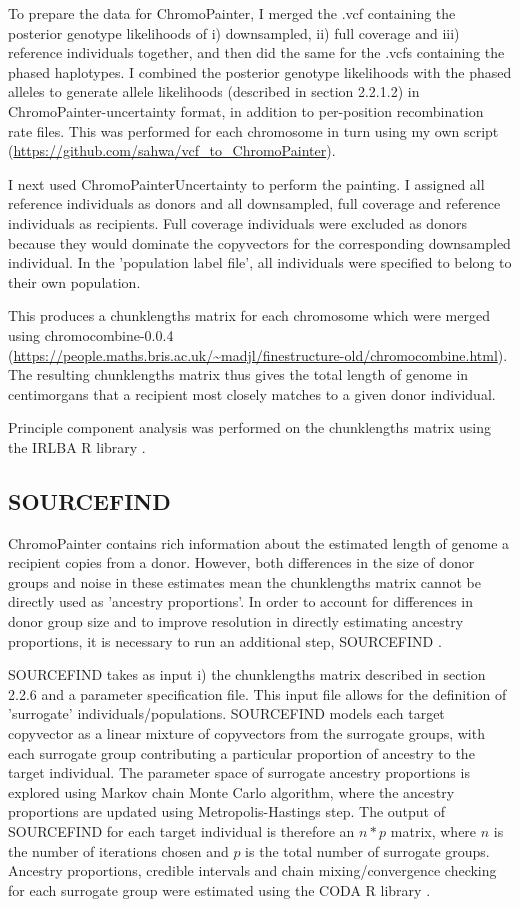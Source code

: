 To prepare the data for ChromoPainter, I merged the .vcf containing the posterior genotype likelihoods of i) downsampled, ii) full coverage and iii) reference individuals together, and then did the same for the .vcfs containing the phased haplotypes.  I combined the posterior genotype likelihoods with the phased alleles to generate allele likelihoods (described in section 2.2.1.2) in ChromoPainter-uncertainty format, in addition to per-position recombination rate files. This was performed for each chromosome in turn using my own script (\url{https://github.com/sahwa/vcf_to_ChromoPainter}).

I next used ChromoPainterUncertainty to perform the painting. I assigned all reference individuals as donors and all downsampled, full coverage and reference individuals as recipients. Full coverage individuals were excluded as donors because they would dominate the copyvectors for the corresponding downsampled individual. In the 'population label file', all individuals were specified to belong to their own population. 

This produces a chunklengths matrix for each chromosome which were merged using chromocombine-0.0.4 (\url{https://people.maths.bris.ac.uk/~madjl/finestructure-old/chromocombine.html}). The resulting chunklengths matrix thus gives the total length of genome in centimorgans that a recipient most closely matches to a given donor individual. 

Principle component analysis was performed on the chunklengths matrix using the IRLBA R library \cite{baglama2005augmented}.

\subsection{SOURCEFIND}

ChromoPainter contains rich information about the estimated length of genome a recipient copies from a donor. However, both differences in the size of donor groups and noise in these estimates mean the chunklengths matrix cannot be directly used as 'ancestry proportions'. In order to account for differences in donor group size and to improve resolution in directly estimating ancestry proportions, it is necessary to run an additional step, SOURCEFIND \cite{Chacon-Duque2018}.

SOURCEFIND takes as input i) the chunklengths matrix described in section 2.2.6 and a parameter specification file. This input file allows for the definition of 'surrogate' individuals/populations. SOURCEFIND models each target copyvector as a linear mixture of copyvectors from the surrogate groups, with each surrogate group contributing a particular proportion of ancestry to the target individual. The parameter space of surrogate ancestry proportions is explored using Markov chain Monte Carlo algorithm, where the ancestry proportions are updated using Metropolis-Hastings step. The output of SOURCEFIND for each target individual is therefore an $n*p$ matrix, where $n$ is the number of iterations chosen and $p$ is the total number of surrogate groups. Ancestry proportions, credible intervals and chain mixing/convergence checking for each surrogate group were estimated using the CODA R library \cite{oro22547}.

